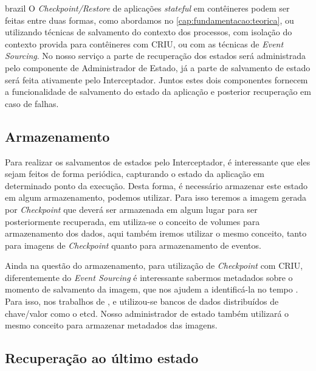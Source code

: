 \begin{otherlanguage*}{brazil}
O \textit{Checkpoint/Restore} de aplicações \textit{stateful} em contêineres podem ser
feitas entre duas formas, como abordamos no \ref{cap:fundamentacao:teorica}, ou
utilizando técnicas de salvamento do contexto dos processos, com isolação do contexto
provida para contêineres \cite{muller2022architecture} com CRIU, ou com as técnicas de
\textit{Event Sourcing}. No nosso serviço a parte de recuperação dos estados será
administrada pelo componente de Administrador de Estado, já a parte de salvamento de estado
será feita ativamente pelo Interceptador. Juntos estes dois componentes fornecem a
funcionalidade de salvamento do estado da aplicação e posterior recuperação em caso
de falhas.

\subsection{Armazenamento}

Para realizar os salvamentos de estados pelo Interceptador, é interessante que eles sejam
feitos de forma periódica, capturando o estado da aplicação em determinado ponto da execução.
Desta forma, é necessário armazenar este estado em algum armazenamento, podemos utilizar. Para
isso teremos a imagem gerada por \textit{Checkpoint} que deverá ser armazenada em algum lugar
para ser posteriormente recuperada, em \cite{vayghan2021kubernetes} utiliza-se o conceito de
volumes para armazenamento dos dados, aqui também iremos utilizar o mesmo conceito, tanto para
imagens de \textit{Checkpoint} quanto para armazenamento de eventos.

Ainda na questão do armazenamento, para utilização de \textit{Checkpoint} com CRIU,
diferentemente do \textit{Event Sourcing} é interessante sabermos metadados sobre o momento
de salvamento da imagem, que nos ajudem a identificá-la no tempo \cite{oh20218stateful}
\cite{muller2022architecture} \cite{Chen2015/10}. Para isso, nos trabalhos de
\cite{muller2022architecture}, \cite{oh20218stateful} e \cite{Chen2015/10} utilizou-se
bancos de dados distribuídos de chave/valor como o etcd. Nosso administrador de estado também
utilizará o mesmo conceito para armazenar metadados das imagens.

\subsection{Recuperação ao último estado}


\end{otherlanguage*}
